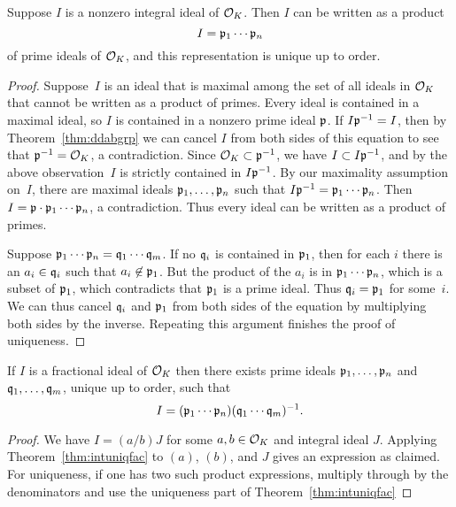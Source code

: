 \begin{theorem}\label{thm:intuniqfac}
Suppose $I$ is a nonzero integral ideal of $\mathcal{O}_K$.  Then $I$ can
be written as a product
$$
  I = \mathfrak{p}_1\cdots \mathfrak{p}_n
$$ of prime ideals of $\mathcal{O}_K$, and this representation is unique up to
order.
\end{theorem}
\begin{proof}
Suppose~$I$ is an ideal that is maximal among the set of all ideals in
$\mathcal{O}_K$ that cannot be written as a product of primes.  Every ideal is
contained in a maximal ideal, so $I$ is contained in a nonzero prime
ideal $\mathfrak{p}$.  If $I\mathfrak{p}^{-1} = I$, then by Theorem~\ref{thm:ddabgrp} we
can cancel $I$ from both sides of this equation to see that
$\mathfrak{p}^{-1}=\mathcal{O}_K$, a contradiction.  Since $\mathcal{O}_K\subset \mathfrak{p}^{-1}$,
we have $I\subset I\mathfrak{p}^{-1}$, and by the above observation~$I$
is strictly contained in
$I\mathfrak{p}^{-1}$.  By our maximality assumption on~$I$, there are maximal
ideals $\mathfrak{p}_1,\ldots, \mathfrak{p}_n$ such that $I\mathfrak{p}^{-1} = \mathfrak{p}_1\cdots \mathfrak{p}_n$.
Then $I=\mathfrak{p}\cdot \mathfrak{p}_1\cdots \mathfrak{p}_n$, a contradiction.  Thus every ideal
can be written as a product of primes.

Suppose $\mathfrak{p}_1\cdots \mathfrak{p}_n=\mathfrak{q}_1\cdots \mathfrak{q}_m$. If no $\mathfrak{q}_i$ is contained in
$\mathfrak{p}_1$, then for each $i$ there is an $a_i\in \mathfrak{q}_i$ such that
$a_i\not\in\mathfrak{p}_1$.  But the product of the $a_i$ is in $\mathfrak{p}_1\cdots
\mathfrak{p}_n$, which is a subset of $\mathfrak{p}_1$, which contradicts that
$\mathfrak{p}_1$ is a prime ideal.  Thus $\mathfrak{q}_i=\mathfrak{p}_1$ for some~$i$.  We can thus
cancel $\mathfrak{q}_i$ and $\mathfrak{p}_1$ from both sides of the equation by multiplying
both sides by the inverse.  Repeating
this argument finishes the proof of uniqueness.
\end{proof}

\begin{theorem}\label{thm:uniqfac}
If $I$ is a fractional ideal of $\mathcal{O}_K$ then there exists
prime ideals $\mathfrak{p}_1,\ldots, \mathfrak{p}_n$ and $\mathfrak{q}_1,\ldots, \mathfrak{q}_m$,
unique up to order, such that
$$
  I = (\mathfrak{p}_1\cdots \mathfrak{p}_n)(\mathfrak{q}_1\cdots \mathfrak{q}_m)^{-1}.
$$
\end{theorem}
\begin{proof}
We have $I=(a/b)J$ for some $a,b\in\mathcal{O}_K$ and integral ideal $J$.
Applying Theorem~\ref{thm:intuniqfac} to $(a)$, $(b)$, and $J$ gives
an expression as claimed.  For uniqueness, if one has two such product
expressions, multiply through by the denominators and use the
uniqueness part of Theorem~\ref{thm:intuniqfac}
\end{proof}

